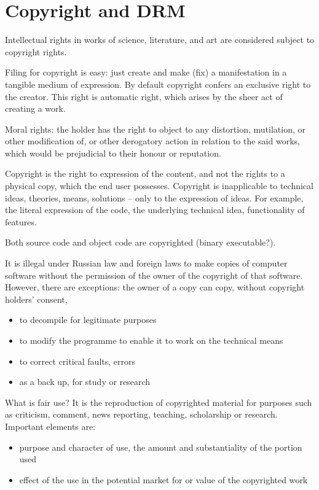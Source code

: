 \documentclass[10pt,a4paper,twocolumn]{article}
\begin{document}


\section{Copyright and DRM} %
\label{sec:copyright_and_drm}

Intellectual rights in works of science, literature, and art are considered subject to
copyright rights.

Filing for copyright is easy: just create and make (fix) a manifestation in a tangible
medium of expression. By default copyright confers an exclusive right to the creator.
This right is automatic right, which arises by the sheer act of creating a work.

Moral rights: the holder has the right to object to any distortion, mutilation, or other
modification of, or other derogatory action in relation to the said works, which would
be prejudicial to their honour or reputation.

Copyright is the right to expression of the content, and not the rights to a physical copy,
which the end user possesses. Copyright is inapplicable to technical ideas, theories, means,
solutions -- only to the expression of ideas. For example, the literal expression of the
code, the underlying technical idea, functionality of features.

Both source code and object code are copyrighted (binary executable?).

It is illegal under Russian law and foreign laws to make copies of computer software
without the permission of the owner of the copyright of that software. However, there
are exceptions: the owner of a copy can copy, without copyright holders' consent,
\begin{itemize}
  \item to decompile for legitimate purposes
  \item to modify the programme to enable it to work on the technical means
  \item to correct critical faults, errors
  \item as a back up, for study or research
\end{itemize}

What is fair use? It is the reproduction of copyrighted material for purposes such as
criticism, comment, news reporting, teaching, scholarship or research. Important elements
are:
\begin{itemize}
  \item purpose and character of use, the amount and substantiality of the portion used
  \item effect of the use in the potential market for or value of the copyrighted work
\end{itemize}
\end{document}
